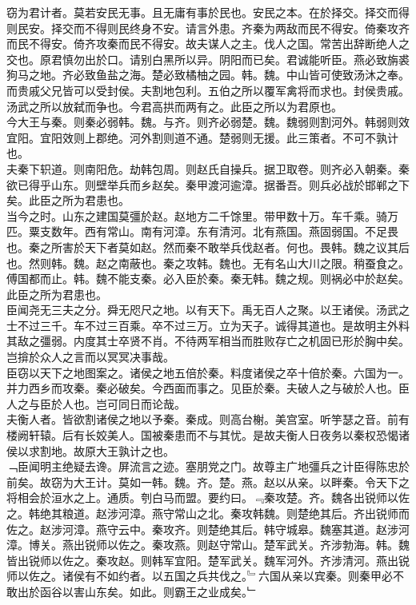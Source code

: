 \documentclass{zhvt-classic}
\begin{document}
\hspace*{2em}窃为君计者。莫若安民无事。且无庸有事於民也。安民之本。在於择交。择交而得则民安。择交而不得则民终身不安。请言外患。齐秦为两敌而民不得安。倚秦攻齐而民不得安。倚齐攻秦而民不得安。故夫谋人之主。伐人之国。常苦出辞断绝人之交也。原君慎勿出於口。请别白黑所以异。阴阳而已矣。君诚能听臣。燕必致旃裘狗马之地。齐必致鱼盐之海。楚必致橘柚之园。韩。魏。中山皆可使致汤沐之奉。而贵戚父兄皆可以受封侯。夫割地包利。五伯之所以覆军禽将而求也。封侯贵戚。汤武之所以放弑而争也。今君高拱而两有之。此臣之所以为君原也。\\
\hspace*{2em}今大王与秦。则秦必弱韩。魏。与齐。则齐必弱楚。魏。魏弱则割河外。韩弱则效宜阳。宜阳效则上郡绝。河外割则道不通。楚弱则无援。此三策者。不可不孰计也。\\
\hspace*{2em}夫秦下轵道。则南阳危。劫韩包周。则赵氏自操兵。据卫取卷。则齐必入朝秦。秦欲已得乎山东。则壁举兵而乡赵矣。秦甲渡河逾漳。据番吾。则兵必战於邯郸之下矣。此臣之所为君患也。\\
\hspace*{2em}当今之时。山东之建国莫彊於赵。赵地方二千馀里。带甲数十万。车千乘。骑万匹。粟支数年。西有常山。南有河漳。东有清河。北有燕国。燕固弱国。不足畏也。秦之所害於天下者莫如赵。然而秦不敢举兵伐赵者。何也。畏韩。魏之议其后也。然则韩。魏。赵之南蔽也。秦之攻韩。魏也。无有名山大川之限。稍蚕食之。傅国都而止。韩。魏不能支秦。必入臣於秦。秦无韩。魏之规。则祸必中於赵矣。此臣之所为君患也。\\
\hspace*{2em}臣闻尧无三夫之分。舜无咫尺之地。以有天下。禹无百人之聚。以王诸侯。汤武之士不过三千。车不过三百乘。卒不过三万。立为天子。诚得其道也。是故明主外料其敌之彊弱。内度其士卒贤不肖。不待两军相当而胜败存亡之机固已形於胸中矣。岂揜於众人之言而以冥冥决事哉。\\
\hspace*{2em}臣窃以天下之地图案之。诸侯之地五倍於秦。料度诸侯之卒十倍於秦。六国为一。并力西乡而攻秦。秦必破矣。今西面而事之。见臣於秦。夫破人之与破於人也。臣人之与臣於人也。岂可同日而论哉。\\
\hspace*{2em}夫衡人者。皆欲割诸侯之地以予秦。秦成。则高台榭。美宫室。听竽瑟之音。前有楼阙轩辕。后有长姣美人。国被秦患而不与其忧。是故夫衡人日夜务以秦权恐愒诸侯以求割地。故原大王孰计之也。\\
\hspace*{2em}﹁臣闻明主绝疑去谗。屏流言之迹。塞朋党之门。故尊主广地彊兵之计臣得陈忠於前矣。故窃为大王计。莫如一韩。魏。齐。楚。燕。赵以从亲。以畔秦。令天下之将相会於洹水之上。通质。刳白马而盟。要约曰。﹃秦攻楚。齐。魏各出锐师以佐之。韩绝其粮道。赵涉河漳。燕守常山之北。秦攻韩魏。则楚绝其后。齐出锐师而佐之。赵涉河漳。燕守云中。秦攻齐。则楚绝其后。韩守城皋。魏塞其道。赵涉河漳。博关。燕出锐师以佐之。秦攻燕。则赵守常山。楚军武关。齐涉勃海。韩。魏皆出锐师以佐之。秦攻赵。则韩军宜阳。楚军武关。魏军河外。齐涉清河。燕出锐师以佐之。诸侯有不如约者。以五国之兵共伐之。﹄六国从亲以宾秦。则秦甲必不敢出於函谷以害山东矣。如此。则霸王之业成矣。﹂\\
\end{document}
